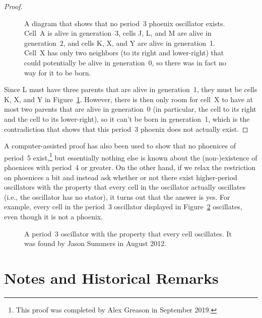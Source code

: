 \begin{proof}
\begin{figure}[!ht]
{}
		\caption{A diagram that shows that no period~3 phoenix oscillator exists. Cell~A is alive in generation~3, cells J, L, and M are alive in generation~2, and cells K, X, and Y are alive in generation~1. Cell~X has only two neighbors (to its right and lower-right) that could potentially be alive in generation~0, so there was in fact no way for it to be born.}\label{fig:phoenix_proof_3}
	\end{figure}
	
	Since L must have three parents that are alive in generation~1, they must be cells K, X, and Y in Figure~\ref{fig:phoenix_proof_3}. However, there is then only room for cell~X to have at most two parents that are alive in generation~0 (in particular, the cell to its right and the cell to its lower-right), so it can't be born in generation~1, which is the contradiction that shows that this period~3 phoenix does not actually exist.
\end{proof}

A computer-assisted proof has also been used to show that no phoenices of period~5 exist,\footnote{This proof was completed by Alex Greason in September 2019.} but essentially nothing else is known about the (non-)existence of phoenices with period~4 or greater. On the other hand, if we relax the restriction on phoenices a bit and instead ask whether or not there exist higher-period oscillators with the property that every cell in the oscillator actually oscillates (i.e., the oscillator has no stator), it turns out that the answer is yes. For example, every cell in the period~3 oscillator displayed in Figure~\ref{fig:period_3_volatile} oscillates, even though it is not a phoenix.

\begin{figure}[!htb]
	\centering
	\caption{A period~3 oscillator with the property that every cell oscillates. It was found by Jason Summers in August 2012.}\label{fig:period_3_volatile}
\end{figure}


\section{Notes and Historical Remarks}\label{sec:oscillators_notes}

